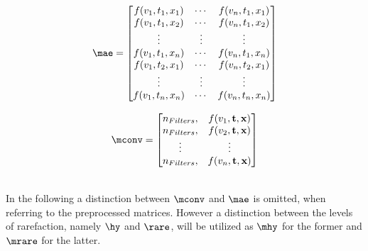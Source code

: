 \begin{minipage}{.55\linewidth}
	\begin{equation}
	\mae = \begin{bmatrix}
	f(v_1,t_1,x_1)&\cdots &f(v_n,t_1,x_1) \\
	f(v_1,t_1,x_2)&\cdots &f(v_n,t_1,x_2) \\
	\vdots& \vdots & \vdots\\
	f(v_1,t_1,x_n)&\cdots &f(v_n,t_1,x_n)\\
	f(v_1,t_2,x_1)&\cdots &f(v_n,t_2,x_1)\\
	\vdots & \vdots & \vdots\\
	f(v_1,t_n,x_n)&\cdots &f(v_n,t_n,x_n)
	\end{bmatrix}
	\label{Eq:AE_matrix}
	\end{equation}
\end{minipage}%
\begin{minipage}{.45\linewidth}
	\begin{equation}
	\mconv= \begin{bmatrix}
	n_{Filters},&f(v_1,\textbf{t},\textbf{x})\\
	n_{Filters},&f(v_2,\textbf{t},\textbf{x})\\
	\vdots&\vdots\\
	n_{Filters},&f(v_n,\textbf{t},\textbf{x})
	\end{bmatrix}
	\label{Eq:CNN_matrix}
	\end{equation}
\end{minipage}\\
In the following a distinction between \(\mconv\) and \(\mae\) is omitted, when referring to the preprocessed matrices. However a distinction between the levels of rarefaction, namely \(\hy\) and \(\rare\), will be utilized as \(\mhy\) for the former and \(\mrare\) for the latter.
